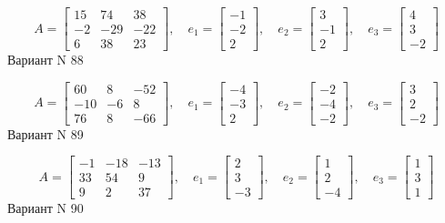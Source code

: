 \documentclass[11pt]{report}
\begin{document}
$$A = \left[\begin{matrix}15 & 74 & 38\\-2 & -29 & -22\\6 & 38 & 23\end{matrix}\right],\quad e_1 = \left[\begin{matrix}-1\\-2\\2\end{matrix}\right],\quad e_2 = \left[\begin{matrix}3\\-1\\2\end{matrix}\right],\quad e_3 = \left[\begin{matrix}4\\3\\-2\end{matrix}\right]$$Вариант N 88

$$A = \left[\begin{matrix}60 & 8 & -52\\-10 & -6 & 8\\76 & 8 & -66\end{matrix}\right],\quad e_1 = \left[\begin{matrix}-4\\-3\\2\end{matrix}\right],\quad e_2 = \left[\begin{matrix}-2\\-4\\-2\end{matrix}\right],\quad e_3 = \left[\begin{matrix}3\\2\\-2\end{matrix}\right]$$Вариант N 89

$$A = \left[\begin{matrix}-1 & -18 & -13\\33 & 54 & 9\\9 & 2 & 37\end{matrix}\right],\quad e_1 = \left[\begin{matrix}2\\3\\-3\end{matrix}\right],\quad e_2 = \left[\begin{matrix}1\\2\\-4\end{matrix}\right],\quad e_3 = \left[\begin{matrix}1\\3\\1\end{matrix}\right]$$Вариант N 90
\end{document}
